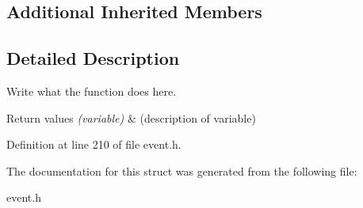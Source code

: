 \subsection*{Additional Inherited Members}


\subsection{Detailed Description}
Write what the function does here. 


\begin{DoxyRetVals}{Return values}
{\em (variable)} & (description of variable) \\
\hline
\end{DoxyRetVals}


Definition at line 210 of file event.\+h.



The documentation for this struct was generated from the following file\+:\begin{DoxyCompactItemize}
\item 
event.\+h\end{DoxyCompactItemize}

